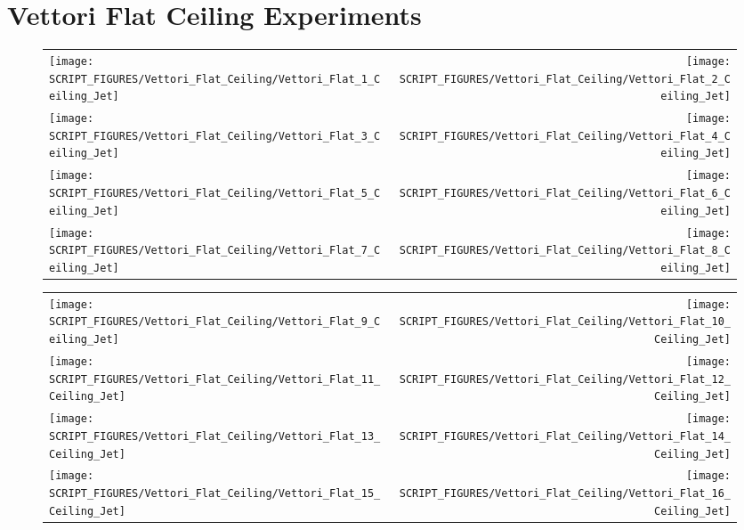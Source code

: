 \clearpage

\section{Vettori Flat Ceiling Experiments}

\begin{figure}[!ht]
\begin{tabular*}{\textwidth}{l@{\extracolsep{\fill}}r}
\texttt{[image: SCRIPT\_FIGURES/Vettori\_Flat\_Ceiling/Vettori\_Flat\_1\_Ceiling\_Jet]} &
\texttt{[image: SCRIPT\_FIGURES/Vettori\_Flat\_Ceiling/Vettori\_Flat\_2\_Ceiling\_Jet]} \\
\texttt{[image: SCRIPT\_FIGURES/Vettori\_Flat\_Ceiling/Vettori\_Flat\_3\_Ceiling\_Jet]} &
\texttt{[image: SCRIPT\_FIGURES/Vettori\_Flat\_Ceiling/Vettori\_Flat\_4\_Ceiling\_Jet]} \\
\texttt{[image: SCRIPT\_FIGURES/Vettori\_Flat\_Ceiling/Vettori\_Flat\_5\_Ceiling\_Jet]} &
\texttt{[image: SCRIPT\_FIGURES/Vettori\_Flat\_Ceiling/Vettori\_Flat\_6\_Ceiling\_Jet]} \\
\texttt{[image: SCRIPT\_FIGURES/Vettori\_Flat\_Ceiling/Vettori\_Flat\_7\_Ceiling\_Jet]} &
\texttt{[image: SCRIPT\_FIGURES/Vettori\_Flat\_Ceiling/Vettori\_Flat\_8\_Ceiling\_Jet]}
\end{tabular*}
\end{figure}

\begin{figure}[!ht]
\begin{tabular*}{\textwidth}{l@{\extracolsep{\fill}}r}
\texttt{[image: SCRIPT\_FIGURES/Vettori\_Flat\_Ceiling/Vettori\_Flat\_9\_Ceiling\_Jet]} &
\texttt{[image: SCRIPT\_FIGURES/Vettori\_Flat\_Ceiling/Vettori\_Flat\_10\_Ceiling\_Jet]} \\
\texttt{[image: SCRIPT\_FIGURES/Vettori\_Flat\_Ceiling/Vettori\_Flat\_11\_Ceiling\_Jet]} &
\texttt{[image: SCRIPT\_FIGURES/Vettori\_Flat\_Ceiling/Vettori\_Flat\_12\_Ceiling\_Jet]} \\
\texttt{[image: SCRIPT\_FIGURES/Vettori\_Flat\_Ceiling/Vettori\_Flat\_13\_Ceiling\_Jet]} &
\texttt{[image: SCRIPT\_FIGURES/Vettori\_Flat\_Ceiling/Vettori\_Flat\_14\_Ceiling\_Jet]} \\
\texttt{[image: SCRIPT\_FIGURES/Vettori\_Flat\_Ceiling/Vettori\_Flat\_15\_Ceiling\_Jet]} &
\texttt{[image: SCRIPT\_FIGURES/Vettori\_Flat\_Ceiling/Vettori\_Flat\_16\_Ceiling\_Jet]}
\end{tabular*}
\end{figure}


